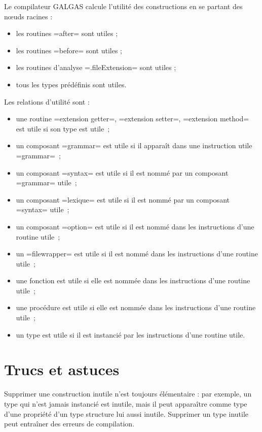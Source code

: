 Le compilateur GALGAS calcule l'utilité des constructions en se partant des nœuds racines :
\begin{itemize}
  \item les routines \ggs=after= sont utiles ;
  \item les routines \ggs=before= sont utiles ;
  \item les routines d'analyse \ggs=.fileExtension= sont utiles ;
  \item tous les types prédéfinis sont utiles.
\end{itemize}

Les relations d'utilité sont :
\begin{itemize}
  \item une routine \ggs=extension getter=, \ggs=extension setter=, \ggs=extension method= est utile si son type est utile~;
  \item un composant \ggs=grammar= est utile si il apparaît dans une instruction utile \ggs=grammar=~;
  \item un composant \ggs=syntax= est utile si il est nommé par un composant \ggs=grammar= utile~;
  \item un composant \ggs=lexique= est utile si il est nommé par un composant \ggs=syntax= utile~;
  \item un composant \ggs=option= est utile si il est nommé dans les instructions d'une routine utile~;
  \item un  \ggs=filewrapper= est utile si il est nommé dans les instructions d'une routine utile~;
  \item une fonction est utile si elle est nommée dans les instructions d'une routine utile~;
  \item une procédure est utile si elle est nommée dans les instructions d'une routine utile~;
  \item un type est utile si il est instancié par les instructions d'une routine utile.
\end{itemize}



\section{Trucs et astuces}

Supprimer une construction inutile n'est toujours élémentaire : par exemple, un type qui n'est jamais instancié est inutile, mais il peut apparaître comme type d'une propriété d'un type structure lui aussi inutile. Supprimer un type inutile peut entraîner des erreurs de compilation.

